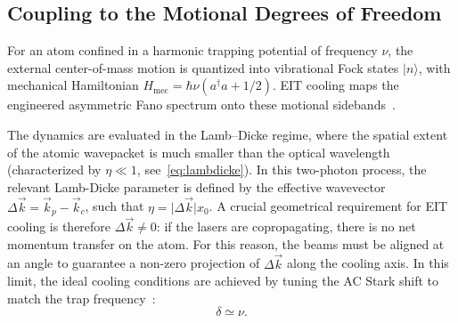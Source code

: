 \subsection{Coupling to the Motional Degrees of Freedom}

For an atom confined in a harmonic trapping potential of frequency $\nu$, the external center-of-mass motion is quantized into vibrational Fock states $|n\rangle$, with mechanical Hamiltonian $H_{\text{mec}} = \hbar\nu(a^\dagger a + 1/2)$. EIT cooling maps the engineered asymmetric Fano spectrum onto these motional sidebands~\cite{Morigi:00}.

The dynamics are evaluated in the Lamb--Dicke regime, where the spatial extent of the atomic wavepacket is much smaller than the optical wavelength (characterized by $\eta \ll 1$, see~\ref{eq:lambdicke}).  In this two-photon process, the relevant Lamb-Dicke parameter is defined by the effective wavevector $\Delta\vec{k} = \vec{k}_p - \vec{k}_c$, such that $\eta = \vert{}\Delta\vec{k}\vert{}x_0$. A crucial geometrical requirement for EIT cooling is therefore $\Delta\vec{k} \neq 0$: if the lasers are copropagating, there is no net momentum transfer on the atom. For this reason, the beams must be aligned at an angle to guarantee a non-zero projection of $\Delta\vec{k}$ along the cooling axis. In this limit, the ideal cooling conditions are achieved by tuning the AC Stark shift to match the trap frequency~\cite{Morigi:00}:
\begin{equation}
    \delta \simeq \nu.
    \label{eq:cooling_condition}
\end{equation}


